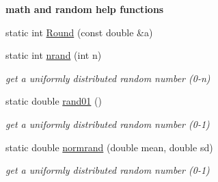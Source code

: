 \begin{Indent}\textbf{ math and random help functions}\par
\begin{DoxyCompactItemize}
\item 
static int \mbox{\hyperlink{class_c_envir_adacbfd0480f38cded2d6b18ea2114405}{Round}} (const double \&a)
\item 
\mbox{\label{class_c_envir_ac0081e2d6bf3d0aa1a2cac6a0ff11dab}} 
static int \mbox{\hyperlink{class_c_envir_ac0081e2d6bf3d0aa1a2cac6a0ff11dab}{nrand}} (int n)
\begin{DoxyCompactList}\small\item\em get a uniformly distributed random number (0-\/n) \end{DoxyCompactList}\item 
\mbox{\label{class_c_envir_ab880593eb314a63743c72a5252b46cfb}} 
static double \mbox{\hyperlink{class_c_envir_ab880593eb314a63743c72a5252b46cfb}{rand01}} ()
\begin{DoxyCompactList}\small\item\em get a uniformly distributed random number (0-\/1) \end{DoxyCompactList}\item 
\mbox{\label{class_c_envir_a15f2a3b32f4946dcdc29d347dbde0673}} 
static double \mbox{\hyperlink{class_c_envir_a15f2a3b32f4946dcdc29d347dbde0673}{normrand}} (double mean, double sd)
\begin{DoxyCompactList}\small\item\em get a uniformly distributed random number (0-\/1) \end{DoxyCompactList}\end{DoxyCompactItemize}
\end{Indent}
